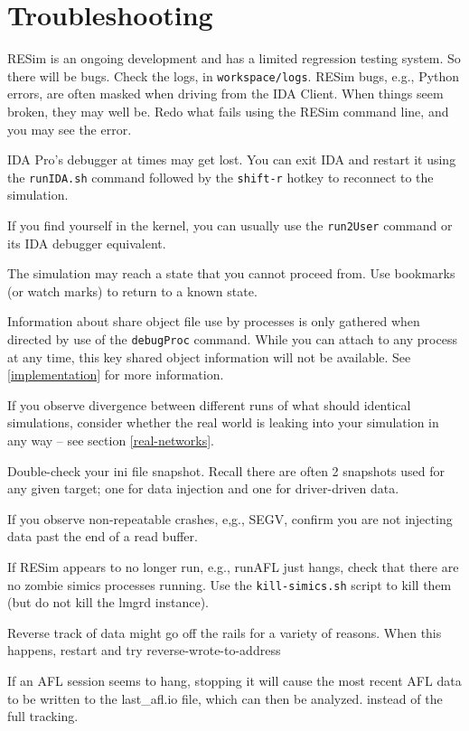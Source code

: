 \documentclass[titlepage]{article}
\begin{document}
\section{Troubleshooting}
\label{troubleshooting}
RESim is an ongoing development and has a limited regression testing system.  So there will be bugs.
Check the logs, in {\tt workspace/logs}.  
RESim bugs, e.g., Python errors, are often masked when driving from the IDA Client.  When things seem broken, they
may well be.  Redo what fails using the RESim command line, and you may see the error.

IDA Pro's debugger at times may get lost.  You can exit IDA and restart it using the {\tt runIDA.sh} command followed by the
{\tt shift-r} hotkey to reconnect to the simulation.

If you find yourself in the kernel, you can usually use the {\tt run2User} command or its IDA debugger equivalent.

The simulation may reach a state that you cannot proceed from.  Use bookmarks (or watch marks) to return to a known state.

Information about share object file use by processes is only gathered when directed by use of the {\tt debugProc} command.
While you can attach to any process at any time, this key shared object information will not be available.  See \ref{implementation}
for more information.

If you observe divergence between different runs of what should identical simulations, consider whether the real world is leaking
into your simulation in any way -- see section \ref{real-networks}.

Double-check your ini file snapshot.  Recall there are often 2 snapshots used for any given target; one for data injection and one for 
driver-driven data.

If you observe non-repeatable crashes, e,g., SEGV, confirm you are not injecting data past the end of a read buffer.

If RESim appears to no longer run, e.g., runAFL just hangs, check that there are no zombie simics processes running.  Use
the {\tt kill-simics.sh} script to kill them (but do not kill the lmgrd instance).

Reverse track of data might go off the rails for a variety of reasons.  When this happens, restart and try reverse-wrote-to-address

If an AFL session seems to hang, stopping it will cause the most recent AFL data to be written to the last\_afl.io file, which can then
be analyzed.
instead of the full tracking.
\end{document}
